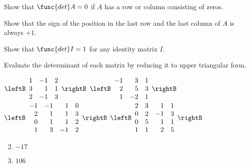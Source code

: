 \begin{multicols}{2}
\begin{ex}
Show that $\func{det } A = 0$ if $A$ has a row or column consisting of zeros.
\end{ex}

\begin{ex}
Show that the sign of the position in the last row and the last column of $A$ is always $+1$.
\end{ex}

\begin{ex}
Show that $\func{det } I = 1$ for any identity matrix $I$.
\end{ex}

\begin{ex}
Evaluate the determinant of each matrix by reducing it to upper triangular form.

\begin{exenumerate}
\exitem $\leftB \begin{array}{rrr}
1 & -1 & 2 \\
3 & 1 & 1 \\
2 & -1 & 3
\end{array} \rightB$
\exitem $\leftB \begin{array}{rrr}
-1 & 3 & 1 \\
2 & 5 & 3  \\
1 & -2 & 1
\end{array} \rightB$
\exitem $\leftB \begin{array}{rrrr}
-1 & -1 & 1 & 0 \\
2 & 1 & 1 & 3 \\
0 & 1 & 1 & 2 \\
1 & 3 & -1 & 2
\end{array} \rightB$
\exitem $\leftB \begin{array}{rrrr}
2 & 3 & 1 & 1 \\
0 & 2 & -1 & 3 \\
0 & 5 & 1 & 1 \\
1 & 1 & 2 & 5
\end{array} \rightB$
\end{exenumerate}
\begin{sol}
\begin{enumerate}[label={\alph*.}]
\setcounter{enumi}{1}
\item  $-17$

\setcounter{enumi}{3}
\item  $106$

\end{enumerate}
\end{sol}
\end{ex}


\end{multicols}
